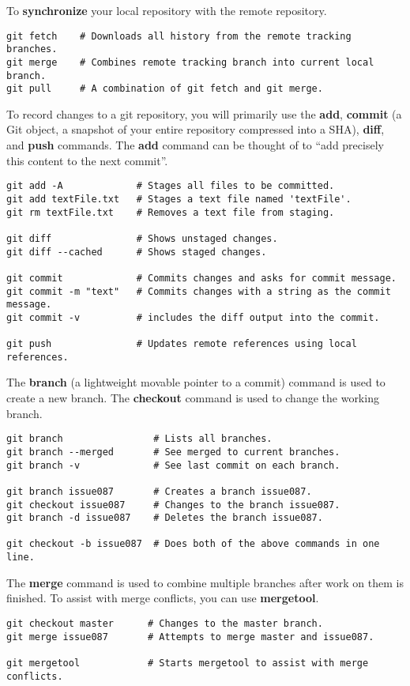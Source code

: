 To \textbf{synchronize} your local repository with the remote repository.
\begin{lstlisting}
git fetch    # Downloads all history from the remote tracking branches.
git merge    # Combines remote tracking branch into current local branch. 
git pull     # A combination of git fetch and git merge.
\end{lstlisting}

To record changes to a git repository, you will primarily use the \textbf{add}, \textbf{commit} (a Git object, a snapshot of your entire repository compressed into a SHA), \textbf{diff}, and \textbf{push} commands. The \textbf{add} command can be thought of to ``add precisely this content to the next commit''. 
\begin{lstlisting}
git add -A             # Stages all files to be committed.
git add textFile.txt   # Stages a text file named 'textFile'.
git rm textFile.txt    # Removes a text file from staging.

git diff               # Shows unstaged changes.
git diff --cached      # Shows staged changes.

git commit             # Commits changes and asks for commit message.
git commit -m "text"   # Commits changes with a string as the commit message.
git commit -v          # includes the diff output into the commit.

git push               # Updates remote references using local references.
\end{lstlisting}


The \textbf{branch} (a lightweight movable pointer to a commit) command is used to create a new branch. The \textbf{checkout} command is used to change the working branch.
\begin{lstlisting}
git branch                # Lists all branches.
git branch --merged       # See merged to current branches.
git branch -v             # See last commit on each branch.

git branch issue087       # Creates a branch issue087.
git checkout issue087     # Changes to the branch issue087.
git branch -d issue087    # Deletes the branch issue087.

git checkout -b issue087  # Does both of the above commands in one line.
\end{lstlisting}

The \textbf{merge} command is used to combine multiple branches after work on them is finished. To assist with merge conflicts, you can use \textbf{mergetool}.
\begin{lstlisting}
git checkout master      # Changes to the master branch.
git merge issue087       # Attempts to merge master and issue087.

git mergetool            # Starts mergetool to assist with merge conflicts.
\end{lstlisting}

